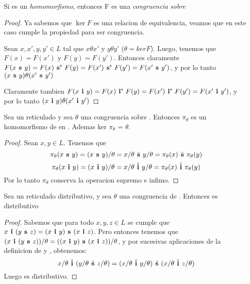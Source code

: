 \begin{lemma}
  Si  es un \emph{homomorfismo}, entonces F es una \emph{congruencia sobre} \reticulAlg
\end{lemma}
\begin{proof}
  Ya sabemos que $\ker F$ es una relacion de equivalencia, veamos que en este caso cumple la propiedad para ser congruencia.

  Sean $x, x', y, y' \in L$ tal que $x\theta x'$ y $y\theta y'$ ($\theta = ker F$). Luego, tenemos que $F(x) = F(x')$ y $F(y) = F(y')$.
  Entonces claramente $F(x\textbf{ s }y) = F(x) \textbf{ s' } F(y) = F(x') \textbf{ s' } F(y') = F(x'\textbf{ s }y')$, y por lo tanto 
  $(x\textbf{ s }y)\theta(x'\textbf{ s }y')$
  
  Claramente tambien $F(x\textbf{ i }y) = F(x) \textbf{ i' } F(y) = F(x') \textbf{ i' } F(y') = F(x'\textbf{ i }y')$, y por lo tanto $(x\textbf{ i }y)\theta(x'\textbf{ i }y')$
\end{proof}

\begin{lemma}
  Sea \reticulAlg un reticulado y sea $\theta$ una congruencia sobre \reticulAlg. Entonces $\pi_\theta$ es un 
  homomorfismo de \reticulAlg en .
  Ademas ker $\pi_\theta$ = $\theta$.
\end{lemma}
\begin{proof}
  Sean $x, y \in L$. Tenemos que
  $$
  \pi_\theta(x\textbf{ s }y) = (x\textbf{ s }y)/\theta = x/\theta \tilde{\textbf{ s }} y/\theta = \pi_\theta(x) \tilde{\textbf{ s }} \pi_\theta(y)
  $$
  $$
  \pi_\theta(x\textbf{ i }y) = (x\textbf{ i }y)/\theta = x/\theta \tilde{\textbf{ i }} y/\theta = \pi_\theta(x) \tilde{\textbf{ i }} \pi_\theta(y)
  $$
  Por lo tanto $\pi_\theta$ conserva la operacion supremo e infimo.

\end{proof}

\begin{remark}
  Sea \reticulAlg un reticulado distributivo, y sea $\theta$ una congruencia de \reticulAlg. Entonces 
  es distributivo
\end{remark}
\begin{proof}
  Sabemos que para todo $x,y,z \in L$ se cumple que $x\textbf{ i }(y\textbf{ s }z) = (x\textbf{ i }y)\textbf{ s }(x\textbf{ i }z)$.
  Pero entonces tenemos que $(x\textbf{ i }(y\textbf{ s }z))/\theta = ((x\textbf{ i }y)\textbf{ s }(x\textbf{ i }z))/\theta$, y por sucesivas aplicaciones de la definicion de \supbincongr{}{} y \infbincongr{}{}, obtenemos:
  $$
  x/\theta\tilde{\textbf{ i }}(y/\theta\tilde{\textbf{ s }}z/\theta) = (x/\theta\tilde{\textbf{ i }}y/\theta)\tilde{\textbf{ s }}(x/\theta\tilde{\textbf{ i }}z/\theta)
  $$
  Luego  es distributivo.
\end{proof}

